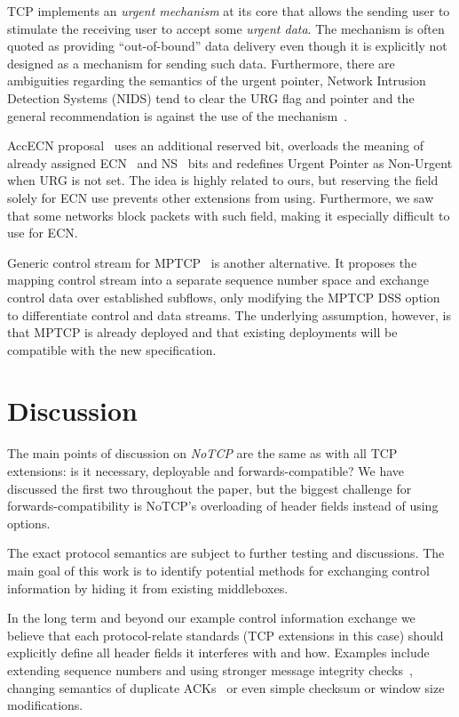 \documentclass{sig-alternate-10pt}
\begin{document}
TCP implements an \emph{urgent mechanism} at its core that allows the sending user to stimulate the receiving user to accept some \emph{urgent data}. The mechanism is often quoted as providing ``out-of-bound'' data delivery even though it is explicitly not designed as a mechanism for sending such data. Furthermore, there are ambiguities regarding the semantics of the urgent pointer, Network Intrusion Detection Systems (NIDS) tend to clear the URG flag and pointer and the general recommendation is against the use of the mechanism~\cite{Gont:2011vi}.

AccECN proposal~\cite{Kuhlewind:2014vd} uses an additional reserved bit, overloads the meaning of already assigned ECN~\cite{Floyd:up} and NS~\cite{Ely:uc} bits and redefines Urgent Pointer as Non-Urgent when URG is not set. The idea is highly related to ours, but reserving the field solely for ECN use prevents other extensions from using. Furthermore, we saw that some networks block packets with such field, making it especially difficult to use for ECN.

Generic control stream for MPTCP~\cite{Bonaventure:wx} is another alternative. It proposes the mapping control stream into a separate sequence number space and exchange control data over established subflows, only modifying the MPTCP DSS option to differentiate control and data streams. The underlying assumption, however, is that MPTCP is already deployed and that existing deployments will be compatible with the new specification.

\section{Discussion}

The main points of discussion on \emph{NoTCP} are the same as with all TCP extensions: is it necessary, deployable and forwards-compatible? We have discussed the first two throughout the paper, but the biggest challenge for forwards-compatibility is NoTCP's overloading of header fields instead of using options.

The exact protocol semantics are subject to further testing and discussions. The main goal of this work is to identify potential methods for exchanging control information by hiding it from existing middleboxes.

In the long term and beyond our example control information exchange we believe that each protocol-relate standards (TCP extensions in this case) should explicitly define all header fields it interferes with and how. Examples include extending sequence numbers and using stronger message integrity checks~\cite{Mazieres:uz}, changing semantics of duplicate ACKs~\cite{Handley:vj,Flach:2013uy} or even simple checksum or window size modifications.
\end{document}
